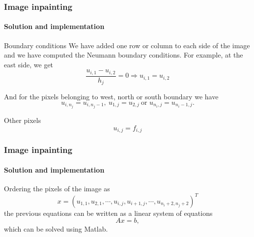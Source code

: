 \documentclass[11pt]{beamer}
\begin{document}
\begin{frame}
\frametitle{Image inpainting}
\framesubtitle{Solution and implementation}
\begin{block}{Boundary conditions}
We have added one row or column to each side of the image and we have computed the Neumann boundary conditions. For example, at the east side, we get
$$\frac{u_{i, 1} - u_{i, 2}}{h_j} = 0\Longrightarrow u_{i,1} = u_{i, 2}$$

And for the pixels belonging to west, north or south boundary we have
$$ u_{i,n_j} = u_{i, n_j-1},\ u_{1,j} = u_{2, j}\ \text{or } u_{n_i,j} = u_{n_i-1, j}.$$
\end{block}

\begin{block}{Other pixels}
$$u_{i, j} = f_{i, j}$$
\end{block}
\end{frame}


\begin{frame}
\frametitle{Image inpainting}
\framesubtitle{Solution and implementation}
Ordering the pixels of the image as
$$x = (u_{1,1}, u_{2,1}, \cdots, u_{i, j}, u_{i+1, j}, \cdots ,u_{n_i + 2,n_j + 2})^T$$
the previous equations can be written as a linear system of equations 
$$Ax = b,$$
which can be solved using Matlab.
\end{frame}
\end{document}
